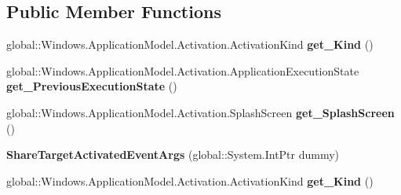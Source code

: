 \subsection*{Public Member Functions}
\begin{DoxyCompactItemize}
\item 
\mbox{\label{class_windows_1_1_application_model_1_1_activation_1_1_share_target_activated_event_args_a6f63726ec764ab6a3e1fec6b977f8dc5}} 
global\+::\+Windows.\+Application\+Model.\+Activation.\+Activation\+Kind {\bfseries get\+\_\+\+Kind} ()
\item 
\mbox{\label{class_windows_1_1_application_model_1_1_activation_1_1_share_target_activated_event_args_a64b106b72efc80cb3b89078a4207e3b0}} 
global\+::\+Windows.\+Application\+Model.\+Activation.\+Application\+Execution\+State {\bfseries get\+\_\+\+Previous\+Execution\+State} ()
\item 
\mbox{\label{class_windows_1_1_application_model_1_1_activation_1_1_share_target_activated_event_args_a1c84d9d210a87e6279fce1cea17244e2}} 
global\+::\+Windows.\+Application\+Model.\+Activation.\+Splash\+Screen {\bfseries get\+\_\+\+Splash\+Screen} ()
\item 
\mbox{\label{class_windows_1_1_application_model_1_1_activation_1_1_share_target_activated_event_args_ac8dc2977a1b7387b5174d423f0f358ff}} 
{\bfseries Share\+Target\+Activated\+Event\+Args} (global\+::\+System.\+Int\+Ptr dummy)
\item 
\mbox{\label{class_windows_1_1_application_model_1_1_activation_1_1_share_target_activated_event_args_a6f63726ec764ab6a3e1fec6b977f8dc5}} 
global\+::\+Windows.\+Application\+Model.\+Activation.\+Activation\+Kind {\bfseries get\+\_\+\+Kind} ()
\item 
\mbox{\label{class_windows_1_1_application_model_1_1_activation_1_1_share_target_activated_event_args_a64b106b72efc80cb3b89078a4207e3b0}} 

\end{DoxyCompactItemize}
